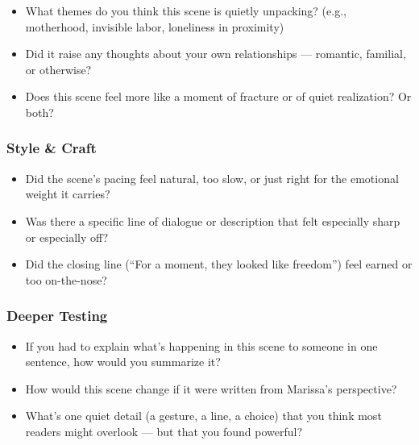 \begin{itemize}
  \item What themes do you think this scene is quietly unpacking? (e.g., motherhood, invisible labor, loneliness in proximity)
  \item Did it raise any thoughts about your own relationships — romantic, familial, or otherwise?
  \item Does this scene feel more like a moment of fracture or of quiet realization? Or both?
\end{itemize}

\subsubsection*{Style \& Craft}

\begin{itemize}
  \item Did the scene’s pacing feel natural, too slow, or just right for the emotional weight it carries?
  \item Was there a specific line of dialogue or description that felt especially sharp or especially off?
  \item Did the closing line (“For a moment, they looked like freedom”) feel earned or too on-the-nose?
\end{itemize}

\subsubsection*{Deeper Testing}

\begin{itemize}
  \item If you had to explain what’s happening in this scene to someone in one sentence, how would you summarize it?
  \item How would this scene change if it were written from Marissa’s perspective?
  \item What’s one quiet detail (a gesture, a line, a choice) that you think most readers might overlook — but that you found powerful?
\end{itemize}

